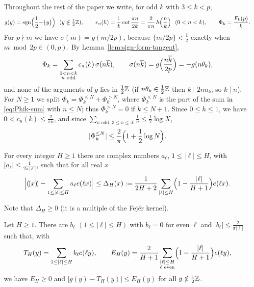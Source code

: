Throughout the rest of the paper we write, for odd $k$ with $3\le k<p$,
\[
g(y)=\sgn\Bigl(\frac12{-}\{y\}\Bigr)\ \ (y\notin\tfrac12\Z),\qquad
c_n(k)=\frac1k\cot\frac{\pi n}{2k}=\frac2{\pi n}\,h\Bigl(\frac nk\Bigr)\ \ (0<n<k),\qquad
\Phi_k=\frac{F_k(p)}{k}.
\]
For $p\nmid m$ we have $\sigma(m)=g(m/2p)$, because $\{m/2p\}<\frac12$ exactly when $m\bmod2p\in(0,p)$. By
Lemma~\ref{lem:sign-form-tangent},
\begin{equation}\label{eq:Phik-sum}
\Phi_k=\sum_{\substack{0<n<k\\ n\text{ odd}}}c_n(k)\,\sigma(n\overline{k}),\qquad
\sigma(n\overline{k})=g\Bigl(\frac{n\overline{k}}{2p}\Bigr)=-g(n\theta_k),
\end{equation}
and none of the arguments of $g$ lies in $\frac12\mathbb{Z}$ (if $n\theta_k\in\frac12\mathbb{Z}$ then $k\mid2nu_k$, so $k\mid n$). For
$N\ge1$ we split $\Phi_k=\Phi_k^{\le N}+\Phi_k^{>N}$, where $\Phi_k^{\le N}$ is the part of the sum in
\eqref{eq:Phik-sum} with $n\le N$; thus $\Phi_k^{>N}=0$ if $k\le N+1$. Since $0\le h\le1$, we have
$0<c_n(k)\le\frac2{\pi n}$, and since $\sum_{n\text{ odd},\,3\le n\le X}\frac1n\le\frac12\log X$,
\begin{equation}\label{eq:head-trivial}
|\Phi_k^{\le N}|\le\frac2\pi\Bigl(1+\frac12\log N\Bigr).
\end{equation}

\begin{lemma}\label{lem:vaaler}
For every integer $H\ge1$ there are complex numbers $a_\ell$, $1\le|\ell|\le H$, with $|a_\ell|\le\frac1{2\pi|\ell|}$,
such that for all real $x$
\[
\Big|(\!(x)\!)-\sum_{1\le|\ell|\le H}a_\ell e(\ell x)\Big|\le\Delta_H(x):=\frac1{2H+2}\sum_{|\ell|\le H}
\Bigl(1-\frac{|\ell|}{H+1}\Bigr)e(\ell x).
\]
\end{lemma}

Note that $\Delta_H\ge0$ (it is a multiple of the Fej\'er kernel).

\begin{lemma}\label{lem:square-wave}
Let $H\ge1$. There are $b_\ell$ $(1\le|\ell|\le H)$ with $b_\ell=0$ for even $\ell$ and $|b_\ell|\le\frac2{\pi|\ell|}$
such that, with
\[
T_H(y)=\sum_{1\le|\ell|\le H}b_\ell e(\ell y),\qquad E_H(y)=\frac2{H+1}\sum_{\substack{|\ell|\le H\\ \ell\text{ even}}}
\Bigl(1-\frac{|\ell|}{H+1}\Bigr)e(\ell y),
\]
we have $E_H\ge0$ and $|g(y)-T_H(y)|\le E_H(y)$ for all $y\notin\frac12\mathbb{Z}$.
\end{lemma}


